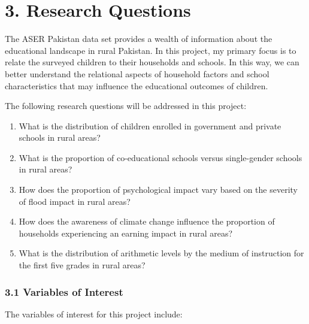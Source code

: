 \documentclass[
]{article}
\providecommand{\tightlist}{%
  \setlength{\itemsep}{0pt}\setlength{\parskip}{0pt}}
\begin{document}
\section{3. Research Questions}\label{research-questions}

The ASER Pakistan data set provides a wealth of information about the
educational landscape in rural Pakistan. In this project, my primary
focus is to relate the surveyed children to their households and
schools. In this way, we can better understand the relational aspects of
household factors and school characteristics that may influence the
educational outcomes of children.

The following research questions will be addressed in this project:

\begin{enumerate}
\def\labelenumi{\arabic{enumi}.}
\tightlist
\item
  What is the distribution of children enrolled in government and
  private schools in rural areas?
\item
  What is the proportion of co-educational schools versus single-gender
  schools in rural areas?
\item
  How does the proportion of psychological impact vary based on the
  severity of flood impact in rural areas?
\item
  How does the awareness of climate change influence the proportion of
  households experiencing an earning impact in rural areas?
\item
  What is the distribution of arithmetic levels by the medium of
  instruction for the first five grades in rural areas?
\end{enumerate}

\subsubsection{3.1 Variables of Interest}\label{variables-of-interest}

The variables of interest for this project include:
\end{document}
